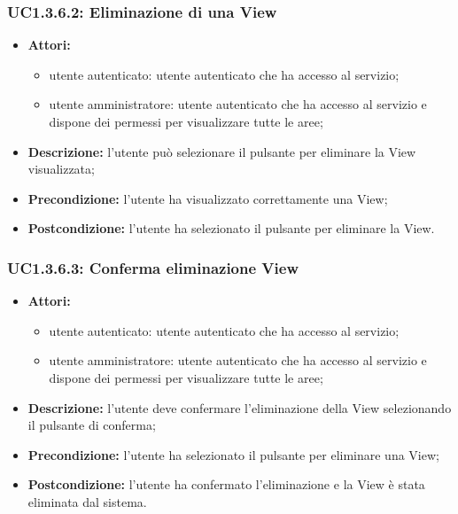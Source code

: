 \subsubsection{UC1.3.6.2: Eliminazione di una View}

\begin{itemize}
   	\item \textbf{Attori:}
    \begin{itemize}
    	\item utente autenticato: utente autenticato che ha accesso al servizio;
    	\item utente amministratore: utente autenticato che ha accesso al servizio e dispone dei permessi per visualizzare tutte le aree;
	\end{itemize}
    \item \textbf{Descrizione:} l'utente può selezionare il pulsante per eliminare la View visualizzata;
    \item \textbf{Precondizione:} l'utente ha visualizzato correttamente una View;
    \item \textbf{Postcondizione:} l'utente ha selezionato il pulsante per eliminare la View.
\end{itemize}

\subsubsection{UC1.3.6.3: Conferma eliminazione View}

\begin{itemize}
   	\item \textbf{Attori:}
    \begin{itemize}
    	\item utente autenticato: utente autenticato che ha accesso al servizio;
    	\item utente amministratore: utente autenticato che ha accesso al servizio e dispone dei permessi per visualizzare tutte le aree;
	\end{itemize}
    \item \textbf{Descrizione:} l'utente deve confermare l'eliminazione della View selezionando il pulsante di conferma;
    \item \textbf{Precondizione:} l'utente ha selezionato il pulsante per eliminare una View;
    \item \textbf{Postcondizione:} l'utente ha confermato l'eliminazione e la View è stata eliminata dal sistema.
\end{itemize}

